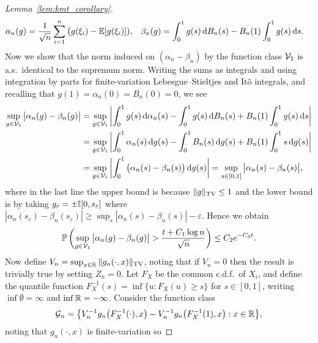 \begin{proof}[Lemma~\ref{lem:kmt_corollary}]
\begin{align*}
    \alpha_n(g)
    &=
    \frac{1}{\sqrt{n}}
    \sum_{i=1}^n
    \big( g(\xi_i) - \mathbb{E}[g(\xi_i)]),
    &\beta_n(g)
    &= \int_0^1 g(s) \,\mathrm{d}B_n(s)
    - B_n(1) \int_0^1 g(s) \,\mathrm{d}s.
  \end{align*}
  Now we show that the norm induced on
  $(\alpha_n - \beta_n)$
  by the function class $\mathcal{V}_1$ is a.s.\ identical to the
  supremum norm.
  Writing the sums as integrals and using integration by parts
  for finite-variation Lebesgue--Stieltjes and It\^o integrals,
  and recalling that $g(1) = \alpha_n(0) = B_n(0) = 0$,
  we see
  \begin{align*}
    \sup_{g \in \mathcal{V}_1}
    \big|\alpha_n(g) - \beta_n(g)\big|
    &=
    \sup_{g \in \mathcal{V}_1}
    \left|
    \int_0^1 g(s) \,\mathrm{d}\alpha_n(s)
    - \int_0^1 g(s) \,\mathrm{d}B_n(s)
    + B_n(1) \int_0^1 g(s) \,\mathrm{d}s
    \right| \\
    &=
    \sup_{g \in \mathcal{V}_1}
    \left|
    \int_0^1 \alpha_n(s) \,\mathrm{d}g(s)
    - \int_0^1 B_n(s) \,\mathrm{d}g(s)
    + B_n(1) \int_0^1 s \,\mathrm{d}g(s)
    \right| \\
    &=
    \sup_{g \in \mathcal{V}_1}
    \left|
    \int_0^1 \big(\alpha_n(s) - \beta_n(s)\big)
    \,\mathrm{d}g(s)
    \right|
    = \sup_{s \in [0,1]}
    \big|
    \alpha_n(s) - \beta_n(s)
    \big|,
  \end{align*}
  where in the last line
  the upper bound is because $\|g\|_{\mathrm{TV}} \leq 1$
  and the lower bound is by taking
  $g_\varepsilon = \pm \mathbb{I}[0,s_\varepsilon]$ where
  $|\alpha_n(s_\varepsilon) - \beta_n(s_\varepsilon)|
  \geq \sup_s |\alpha_n(s) - \beta_n(s)| -
  \varepsilon$.
  Hence we obtain
  \begin{align}
    \label{eq:kmt_concentration}
    \mathbb{P}\left(
      \sup_{g \in \mathcal{V}_1}
      \big|\alpha_n(g) - \beta_n(g)\big|
      > \frac{t + C_1\log n}{\sqrt{n}}
    \right)
    \leq C_2 e^{-C_3 t}.
  \end{align}
  Now define $V_n = \sup_{x \in \mathbb{R}} \|g_n(\cdot, x)\|_{\mathrm{TV}}$,
  noting that if $V_n = 0$ then the result is trivially true
  by setting $Z_n = 0$.
  Let $F_X$ be the common c.d.f.\ of $X_i$,
  and define the quantile function
  $F_X^{-1}(s) = \inf \{u: F_X(u) \geq s\}$ for $s \in [0,1]$,
  writing $\inf \emptyset = \infty$
  and $\inf \mathbb{R} = -\infty$.
  Consider the function class
  \begin{align*}
    \mathcal{G}_n = \big\{
    V_n^{-1} g_n\big(F_X^{-1}(\cdot), x\big)
    - V_n^{-1} g_n\big(F_X^{-1}(1), x\big)
    : x \in \mathbb{R} \big\},
  \end{align*}
  noting that $g_n(\cdot,x)$
  is finite-variation so

\end{proof}
